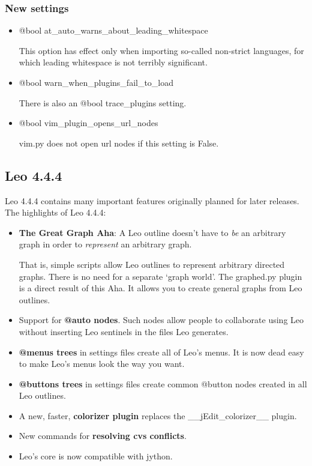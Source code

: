 \documentclass[a4paper,10pt,english]{sphinxmanual}
\begin{document}
\subsubsection{New settings}
\label{what-is-new:id16}\begin{itemize}
\item {} 
@bool at\_auto\_warns\_about\_leading\_whitespace

This option has effect only when importing so-called non-strict languages, for
which leading whitespace is not terribly significant.

\item {} 
@bool warn\_when\_plugins\_fail\_to\_load

There is also an @bool trace\_plugins setting.

\item {} 
@bool vim\_plugin\_opens\_url\_nodes

vim.py does not open url nodes if this setting is False.

\end{itemize}


\subsection{Leo 4.4.4}
\label{what-is-new:leo-4-4-4}
Leo 4.4.4 contains many important features originally planned for later releases.
The highlights of Leo 4.4.4:
\begin{itemize}
\item {} 
\textbf{The Great Graph Aha}:
A Leo outline doesn't have to \emph{be} an arbitrary graph in order to \emph{represent} an arbitrary graph.

That is, simple scripts allow Leo outlines to represent arbitrary
directed graphs. There is no need for a separate `graph world'. The graphed.py
plugin is a direct result of this Aha. It allows you to create general graphs
from Leo outlines.

\item {} 
Support for \textbf{@auto nodes}.  Such nodes allow people to collaborate using Leo
without inserting Leo sentinels in the files Leo generates.

\item {} 
\textbf{@menus trees} in settings files create all of Leo's menus.  It is now dead
easy to make Leo's menus look the way you want.

\item {} 
\textbf{@buttons trees} in settings files create common @button nodes created in all
Leo outlines.

\item {} 
A new, faster, \textbf{colorizer plugin} replaces the \_\_jEdit\_colorizer\_\_ plugin.

\item {} 
New commands for \textbf{resolving cvs conflicts}.

\item {} 
Leo's core is now compatible with jython.

\end{itemize}
\end{document}
